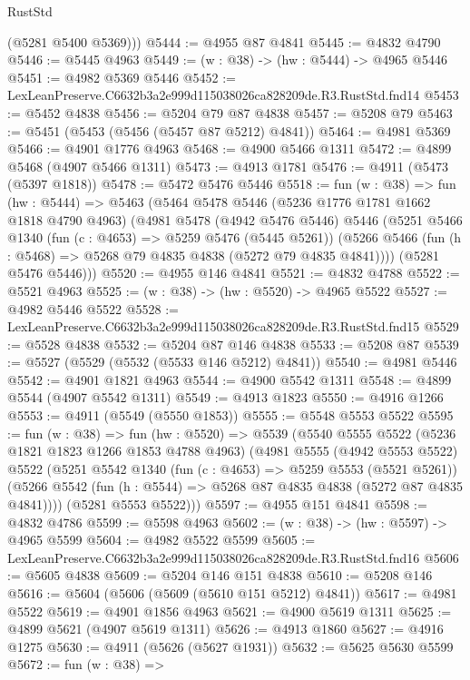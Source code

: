 \begin{lexlean}{RustStd}
\begin{coremodule}
        (@5281 @5400 @5369)))
@5444 := @4955 @87 @4841
@5445 := @4832 @4790
@5446 := @5445 @4963
@5449 := (w : @38) -> (hw : @5444) -> @4965 @5446
@5451 := @4982 @5369 @5446
@5452 := LexLeanPreserve.C6632b3a2e999d115038026ca828209de.R3.RustStd.fnd14
@5453 := @5452 @4838
@5456 := @5204 @79 @87 @4838
@5457 := @5208 @79
@5463 := @5451 (@5453 (@5456 (@5457 @87 @5212) @4841))
@5464 := @4981 @5369
@5466 := @4901 @1776 @4963
@5468 := @4900 @5466 @1311
@5472 := @4899 @5468 (@4907 @5466 @1311)
@5473 := @4913 @1781
@5476 := @4911 (@5473 (@5397 @1818))
@5478 := @5472 @5476 @5446
@5518 := fun (w : @38) =>
  fun (hw : @5444) =>
  @5463
    (@5464
      @5478
      @5446
      (@5236 @1776 @1781 @1662 @1818 @4790 @4963)
      (@4981
        @5478
        (@4942 @5476 @5446)
        @5446
        (@5251
          @5466
          @1340
          (fun (c : @4653) => @5259 @5476 (@5445 @5261))
          (@5266 @5466 (fun (h : @5468) => @5268 @79 @4835 @4838 (@5272 @79 @4835 @4841))))
        (@5281 @5476 @5446)))
@5520 := @4955 @146 @4841
@5521 := @4832 @4788
@5522 := @5521 @4963
@5525 := (w : @38) -> (hw : @5520) -> @4965 @5522
@5527 := @4982 @5446 @5522
@5528 := LexLeanPreserve.C6632b3a2e999d115038026ca828209de.R3.RustStd.fnd15
@5529 := @5528 @4838
@5532 := @5204 @87 @146 @4838
@5533 := @5208 @87
@5539 := @5527 (@5529 (@5532 (@5533 @146 @5212) @4841))
@5540 := @4981 @5446
@5542 := @4901 @1821 @4963
@5544 := @4900 @5542 @1311
@5548 := @4899 @5544 (@4907 @5542 @1311)
@5549 := @4913 @1823
@5550 := @4916 @1266
@5553 := @4911 (@5549 (@5550 @1853))
@5555 := @5548 @5553 @5522
@5595 := fun (w : @38) =>
  fun (hw : @5520) =>
  @5539
    (@5540
      @5555
      @5522
      (@5236 @1821 @1823 @1266 @1853 @4788 @4963)
      (@4981
        @5555
        (@4942 @5553 @5522)
        @5522
        (@5251
          @5542
          @1340
          (fun (c : @4653) => @5259 @5553 (@5521 @5261))
          (@5266 @5542 (fun (h : @5544) => @5268 @87 @4835 @4838 (@5272 @87 @4835 @4841))))
        (@5281 @5553 @5522)))
@5597 := @4955 @151 @4841
@5598 := @4832 @4786
@5599 := @5598 @4963
@5602 := (w : @38) -> (hw : @5597) -> @4965 @5599
@5604 := @4982 @5522 @5599
@5605 := LexLeanPreserve.C6632b3a2e999d115038026ca828209de.R3.RustStd.fnd16
@5606 := @5605 @4838
@5609 := @5204 @146 @151 @4838
@5610 := @5208 @146
@5616 := @5604 (@5606 (@5609 (@5610 @151 @5212) @4841))
@5617 := @4981 @5522
@5619 := @4901 @1856 @4963
@5621 := @4900 @5619 @1311
@5625 := @4899 @5621 (@4907 @5619 @1311)
@5626 := @4913 @1860
@5627 := @4916 @1275
@5630 := @4911 (@5626 (@5627 @1931))
@5632 := @5625 @5630 @5599
@5672 := fun (w : @38) =>

\end{coremodule}
\end{lexlean}
